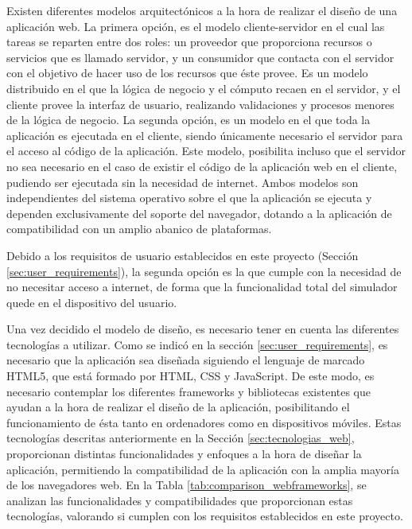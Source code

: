 Existen diferentes modelos arquitectónicos a la hora de realizar el diseño de una aplicación web. La primera opción, es el modelo cliente-servidor en el cual las tareas se reparten entre dos roles: un proveedor que proporciona recursos o servicios que es llamado servidor, y un consumidor que contacta con el servidor con el objetivo de hacer uso de los recursos que éste provee. Es un modelo distribuido en el que la lógica de negocio y el cómputo recaen en el servidor, y el cliente provee la interfaz de usuario, realizando validaciones y procesos menores de la lógica de negocio. La segunda opción, es un modelo en el que toda la aplicación es ejecutada en el cliente, siendo únicamente necesario el servidor para el acceso al código de la aplicación. Este modelo, posibilita incluso que el servidor no sea necesario en el caso de existir el código de la aplicación web en el cliente, pudiendo ser ejecutada sin la necesidad de internet. Ambos modelos son independientes del sistema operativo sobre el que la aplicación  se ejecuta y dependen exclusivamente del soporte del navegador, dotando a la aplicación de compatibilidad con un amplio abanico de plataformas.

Debido a los requisitos de usuario establecidos en este proyecto (Sección \ref{sec:user_requirements}), la segunda opción es la que cumple con la necesidad de no necesitar acceso a internet, de forma que la funcionalidad total del simulador quede en el dispositivo del usuario.

Una vez decidido el modelo de diseño, es necesario tener en cuenta las diferentes tecnologías a utilizar. Como se indicó en la sección \ref{sec:user_requirements}, es necesario que la aplicación sea diseñada siguiendo el lenguaje de marcado HTML5, que está formado por HTML, CSS y JavaScript. De este modo, es necesario contemplar los diferentes frameworks y bibliotecas existentes que ayudan a la hora de realizar el diseño de la aplicación, posibilitando el funcionamiento de ésta tanto en ordenadores como en dispositivos móviles. Estas tecnologías descritas anteriormente en la Sección \ref{sec:tecnologias_web}, proporcionan distintas funcionalidades y enfoques a la hora de diseñar la aplicación, permitiendo la compatibilidad de la aplicación con la amplia mayoría de los navegadores web. En la Tabla \ref{tab:comparison_webframeworks}, se analizan las funcionalidades y compatibilidades que proporcionan estas tecnologías, valorando si cumplen con los requisitos establecidos en este proyecto.

